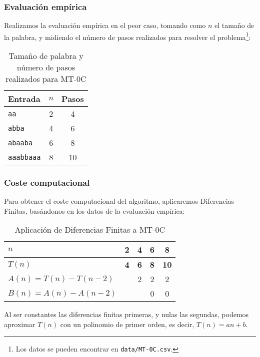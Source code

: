 \subsubsection*{Evaluación empírica}
Realizamos la evaluación empírica en el peor caso, tomando como $n$ el tamaño de la palabra, y midiendo el número de pasos realizados para resolver el problema\footnote{Los datos se pueden encontrar en \texttt{data/MT-0C.csv}.}:

\begin{table}[h]
    \centering
    \begin{tabular}{lcc}
        Entrada & $n$ & Pasos \\
        \hline
        \texttt{aa}             & 2  & 4 \\
        \texttt{abba}           & 4  & 6 \\
        \texttt{abaaba}         & 6  & 8 \\
        \texttt{aaabbaaa}       & 8  & 10 \\
    \end{tabular}
    \caption{Tamaño de palabra y número de pasos realizados para MT-0C}
\end{table}

\subsubsection*{Coste computacional}
Para obtener el coste computacional del algoritmo, aplicaremos Diferencias Finitas, basándonos en los datos de la evaluación empírica:

\begin{table}[H]
    \centering
    \begin{tabular}{|l|c|c|c|c|}
        \hline
        $n$ & \textbf{2} & \textbf{4} & \textbf{6} & \textbf{8} \\ \hline
        $T(n)$ & \textbf{4} & \textbf{6} & \textbf{8} & \textbf{10} \\ \hline
        \hline
        $A(n) = T(n) - T(n-2)$ &   & 2 & 2 & 2 \\ \hline
        $B(n) = A(n) - A(n-2)$ &   &   & 0 & 0 \\ \hline
    \end{tabular}
    \label{tab:0C}
    \caption{Aplicación de Diferencias Finitas a MT-0C}
\end{table}

Al ser constantes las diferencias finitas primeras, y nulas las segundas, podemos aproximar $T(n)$ con un polinomio de primer orden, es decir, $T(n) = an + b$.\medskip

